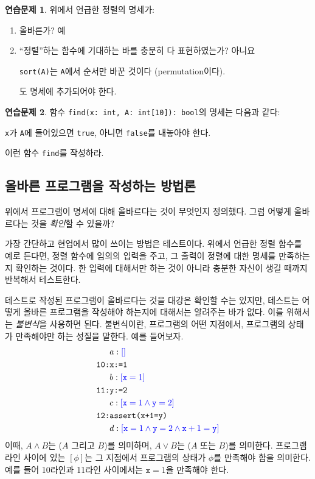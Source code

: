 \documentclass{oblivoir}
\theoremstyle{definition}
\newtheorem{exercise}{연습문제}
\newcommand{\inv}[1]{\textcolor{blue}{\ensuremath{[{#1}]}}}
\begin{document}
\begin{exercise}
  위에서 언급한 정렬의 명세가:
  \begin{enumerate}
  \item 올바른가? 예
  \item ``정렬''하는 함수에 기대하는 바를 충분히 다 표현하였는가?
    아니요
  \begin{center}\texttt{sort(A)}는 \texttt{A}에서 순서만 바꾼 것이다
    (permutation이다).\end{center} 도 명세에 추가되어야 한다.

  \end{enumerate}
\end{exercise}

\begin{exercise}\label{exercise:find}
  함수 \texttt{find(x: int, A: int[10]): bool}의 명세는 다음과 같다:
  \begin{center}\texttt{x}가 \texttt{A}에 들어있으면 \texttt{true}, 아니면
    \texttt{false}를 내놓아야 한다.\end{center} 이런 함수
  \texttt{find}를 작성하라.
\end{exercise}

\subsection{올바른 프로그램을 작성하는 방법론}
위에서 프로그램이 명세에 대해 올바르다는 것이 무엇인지 정의했다.  그럼
어떻게 올바르다는 것을 \emph{확인}할 수 있을까?

가장 간단하고 현업에서 많이 쓰이는 방법은 테스트이다.  위에서 언급한
정렬 함수를 예로 든다면, 정렬 함수에 임의의 입력을 주고, 그 출력이
정렬에 대한 명세를 만족하는지 확인하는 것이다.  한 입력에 대해서만 하는
것이 아니라 충분한 자신이 생길 때까지 반복해서 테스트한다.

테스트로 작성된 프로그램이 올바르다는 것을 대강은 확인할 수는 있지만,
테스트는 어떻게 올바른 프로그램을 작성해야 하는지에 대해서는 알려주는
바가 없다.  이를 위해서는 \emph{불변식}을 사용하면 된다.  불변식이란,
프로그램의 어떤 지점에서, 프로그램의 상태가 만족해야만 하는 성질을
말한다.  예를 들어보자.
\begin{align*}
& a: \inv{} \\
\texttt{10:}& \texttt{x:=1} \\
& b: \inv{\texttt{x}=1} \\
\texttt{11:}& \texttt{y:=2} \\
& c: \inv{\texttt{x}=1 \land \texttt{y}=2} \\
\texttt{12:}& \texttt{assert(x+1=y)} \\
& d: \inv{\texttt{x}=1 \land \texttt{y}=2 \land \texttt{x}+1=\texttt{y}}
\end{align*}
\noindent 이때, $A \land B$는 ($A$ 그리고 $B$)를 의미하며, $A \lor
B$는 ($A$ 또는 $B$)를 의미한다.  프로그램 라인 사이에 있는 $[\phi]$는
그 지점에서 프로그램의 상태가 $\phi$를 만족해야 함을 의미한다.  예를
들어 10라인과 11라인 사이에서는 $\texttt{x}=1$을 만족해야 한다.
\end{document}
